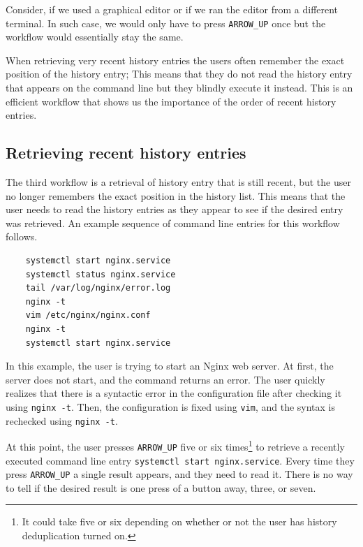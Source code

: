 Consider, if we used a graphical editor or if we ran the editor from a different terminal. In such case, we would only have to press \verb|ARROW_UP| once but the workflow would essentially stay the same.

When retrieving very recent history entries the users often remember the exact position of the history entry; This means that they do not read the history entry that appears on the command line but they blindly execute it instead. This is an efficient workflow that shows us the importance of the order of recent history entries.

\subsection{Retrieving recent history entries}\label{workflow-recent-history-arrow-up}
The third workflow is a retrieval of history entry that is still recent, but the user no longer remembers the exact position in the history list. This means that the user needs to read the history entries as they appear to see if the desired entry was retrieved. An example sequence of command line entries for this workflow follows.

\begin{verbatim}
    systemctl start nginx.service
    systemctl status nginx.service
    tail /var/log/nginx/error.log
    nginx -t
    vim /etc/nginx/nginx.conf
    nginx -t
    systemctl start nginx.service
\end{verbatim}

In this example, the user is trying to start an Nginx \cite{reese2008nginx} web server. At first, the server does not start, and the command returns an error. The user quickly realizes that there is a syntactic error in the configuration file after checking it using \verb|nginx -t|. Then, the configuration is fixed using \verb|vim|, and the syntax is rechecked using \verb|nginx -t|. 

At this point, the user presses \verb|ARROW_UP| five or six times\footnote{It could take five or six depending on whether or not the user has history deduplication turned on.} to retrieve a recently executed command line entry \verb|systemctl start nginx.service|. Every time they press \verb|ARROW_UP| a single result appears, and they need to read it. There is no way to tell if the desired result is one press of a button away, three, or seven. %


